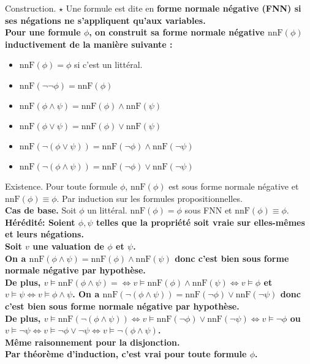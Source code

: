 \documentclass[french, 11pt]{article}
\newcommand*{\nnF}{\text{nnF}}
\begin{document}
\begin{defi}{Construction. $\star$}{}
    Une formule est dite en \bf{forme normale négative (FNN)} si ses négations ne s'appliquent qu'aux variables.\\
    Pour une formule $\phi$, on construit sa forme normale négative $\nnF(\phi)$ inductivement de la manière suivante :
    \begin{itemize}[topsep=0pt,itemsep=-0.9 ex]
        \item $\nnF(\phi)=\phi$ si c'est un littéral.
        \item $\nnF(\lnot\lnot\phi)=\nnF(\phi)$
        \item $\nnF(\phi\land\psi)=\nnF(\phi)\land\nnF(\psi)$
        \item $\nnF(\phi\lor\psi)=\nnF(\phi)\lor\nnF(\psi)$
        \item $\nnF(\lnot(\phi\lor\psi))=\nnF(\lnot\phi)\land\nnF(\lnot\psi)$
        \item $\nnF(\lnot(\phi\land\psi))=\nnF(\lnot\phi)\lor\nnF(\lnot\psi)$
    \end{itemize}
\end{defi}

\begin{prop}{Existence.}{}
    Pour toute formule $\phi$, $\nnF(\phi)$ est sous forme normale négative et $\nnF(\phi)\equiv\phi$.
    \tcblower
    Par induction sur les formules propositionnelles.\\
    \textbf{Cas de base.} Soit $\phi$ un littéral. $\nnF(\phi)=\phi$ sous FNN et $\nnF(\phi)\equiv\phi$.\\
    \bf{Hérédité:} Soient $\phi,\psi$ telles que la propriété soit vraie sur elles-mêmes et leurs négations.\\
    Soit $v$ une valuation de $\phi$ et $\psi$.\\
    On a $\nnF(\phi\land\psi)=\nnF(\phi)\land\nnF(\psi)$ donc c'est bien sous forme normale négative par hypothèse.\\
    De plus, $v\vDash\nnF(\phi \land \psi)=\iff v\vDash\nnF(\phi)\land\nnF(\psi)\iff v\vDash\phi$ et $v\vDash\psi\iff v\vDash\phi\land\psi$.\n
    On a $\nnF(\lnot(\phi\land\psi))=\nnF(\lnot\phi)\lor\nnF(\lnot\psi)$ donc c'est bien sous forme normale négative par hypothèse.\\
    De plus, $v\vDash\nnF(\lnot(\phi \land \psi)) \Leftrightarrow v\vDash\nnF(\lnot\phi)\lor\nnF(\lnot\psi)\Leftrightarrow v\vDash\lnot\phi$ ou $v\vDash\lnot\psi\Leftrightarrow v\vDash\lnot\phi\lor\lnot\psi\Leftrightarrow v\vDash\lnot(\phi \land \psi)$.\\
    Même raisonnement pour la disjonction.\\
    Par théorème d'induction, c'est vrai pour toute formule $\phi$.
\end{prop}
\end{document}
